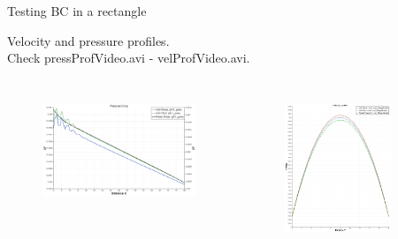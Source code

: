 \documentclass{beamer}
\begin{document}
	\begin{frame}{Testing BC in a rectangle}\label{sec:pressBCRectangle}
		
		Velocity and pressure profiles.\\
		Check pressProfVideo.avi - velProfVideo.avi.
		\begin{columns}
			\begin{figure}
				\centering
				
				\centering
				\includegraphics[width=\textwidth]{pics/pressDropBox.png}
				\label{}
			\end{figure}
		
			
			\begin{figure}
				\centering
				
				\includegraphics[width=0.8\textwidth]{pics/velDropBox.png}
				\label{}
			\end{figure}
		\end{columns}
	\end{frame}
	
\end{document}
